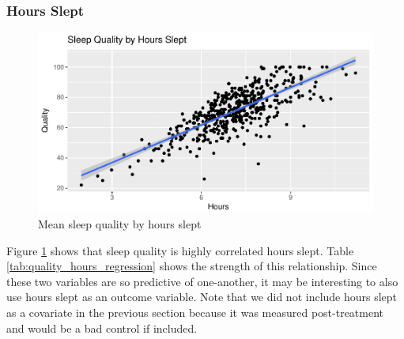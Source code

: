 \documentclass[12pt,]{article}
\begin{document}
\hypertarget{hours-slept}{%
\subsubsection{Hours Slept}\label{hours-slept}}

\begin{figure}
\centering
\includegraphics{report_files/figure-latex/quality_by_hours_fig-1.pdf}
\caption{\label{fig:quality_by_hours_fig} Mean sleep quality by hours
slept}
\end{figure}

Figure \ref{fig:quality_by_hours_fig} shows that sleep quality is highly
correlated hours slept. Table \ref{tab:quality_hours_regression} shows
the strength of this relationship. Since these two variables are so
predictive of one-another, it may be interesting to also use hours slept
as an outcome variable. Note that we did not include hours slept as a
covariate in the previous section because it was measured post-treatment
and would be a bad control if included.
\end{document}

